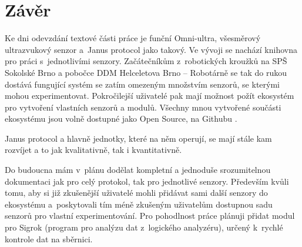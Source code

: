 \newpage
\chapter*{Závěr}

Ke dni odevzdání textové části práce je funční Omni-ultra, všesměrový ultrazvukový senzor a~Janus protocol jako takový.
Ve vývoji se nachází knihovna pro práci s~jednotlivími senzory.
Začátečníkům z~robotických kroužků na SPŠ Sokolské Brno \cite{sokolska} a pobočce DDM Helceletova Brno -- Robotárně \cite{robotarna} se tak do rukou dostává fungující systém se zatím omezeným množstvím senzorů, se kterými mohou experimentovat.
Pokročilejší uživatelé pak mají možnost požít ekosystém pro vytvoření vlastních senzorů a modulů.
Všechny mnou vytvořené součásti ekosystému jsou volně dostupné jako Open Source, na Githubu \cite{protocol}.


Janus protocol a hlavně jednotky, které na něm operují, se mají stále kam rozvíjet a to jak kvalitativně, tak i kvantitativně.

Do budoucna mám v~plánu dodělat kompletní a jednoduše srozumitelnou dokumentaci jak pro celý protokol, tak pro jednotlivé senzory.
Především kvůli tomu, aby si již zkušenější uživatelé mohli přidávat sami další senzory do ekosystému a~poskytovali tím méně zkušeným uživatelům dostupnou sadu senzorů pro vlastní experimentování.
Pro pohodlnost práce plánuji přidat modul pro Sigrok (program pro analýzu dat z~logického analyzéru), určený k~rychlé kontrole dat na sběrnici.
